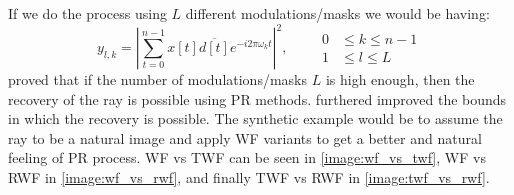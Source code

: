 If we do the process using $L$ different modulations/masks we would be having:
\begin{equation}\label{eq:l_modulation_effect}
	y_{l,k} = \left| \sum_{t=0}^{n-1} x[t]\overline{d[t]} e^{-i2\pi\omega_kt} \right|^2 , \qquad \begin{split}
	0 &\leq k \leq n-1\\
	1 &\leq l \leq L
	\end{split}
  \end{equation}
\cite{ECXLMS2013} proved that if the number of modulations/masks $L$ is high enough, then the recovery of the ray is possible using \ac{PR} methods. 
\cite{Gross2017} furthered improved the bounds in which the recovery is possible. The synthetic example would be to assume the ray to be a natural image and 
apply \ac{WF} variants to get a better and natural feeling of \ac{PR} process. \ac{WF} vs \ac{TWF} can be seen in \cref{image:wf_vs_twf}, \ac{WF} vs \ac{RWF} in \cref{image:wf_vs_rwf}, and finally 
\ac{TWF} vs \ac{RWF} in \cref{image:twf_vs_rwf}.

